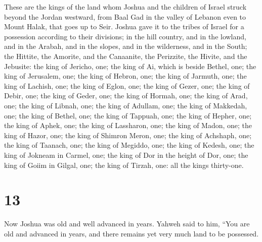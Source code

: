  These are the kings of the land whom Joshua and the
children of Israel struck beyond the Jordan westward, from Baal Gad in
the valley of Lebanon even to Mount Halak, that goes up to Seir. Joshua
gave it to the tribes of Israel for a possession according to their
divisions;  in the hill country, and in the lowland, and
in the Arabah, and in the slopes, and in the wilderness, and in the
South; the Hittite, the Amorite, and the Canaanite, the Perizzite, the
Hivite, and the Jebusite:  the king of Jericho, one; the
king of Ai, which is beside Bethel, one;  the king of
Jerusalem, one; the king of Hebron, one;  the king of
Jarmuth, one; the king of Lachish, one;  the king of
Eglon, one; the king of Gezer, one;  the king of Debir,
one; the king of Geder, one;  the king of Hormah, one;
the king of Arad, one;  the king of Libnah, one; the king
of Adullam, one;  the king of Makkedah, one; the king of
Bethel, one;  the king of Tappuah, one; the king of
Hepher, one;  the king of Aphek, one; the king of
Lassharon, one;  the king of Madon, one; the king of
Hazor, one;  the king of Shimron Meron, one; the king of
Achshaph, one;  the king of Taanach, one; the king of
Megiddo, one;  the king of Kedesh, one; the king of
Jokneam in Carmel, one;  the king of Dor in the height of
Dor, one; the king of Goiim in Gilgal, one;  the king of
Tirzah, one: all the kings thirty-one.

\hypertarget{section-12}{%
\section{13}\label{section-12}}

 Now Joshua was old and well advanced in years. Yahweh
said to him, ``You are old and advanced in years, and there remains yet
very much land to be possessed.

